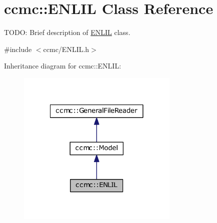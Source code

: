 \hypertarget{classccmc_1_1_e_n_l_i_l}{\section{ccmc\-:\-:E\-N\-L\-I\-L Class Reference}
\label{classccmc_1_1_e_n_l_i_l}
}


T\-O\-D\-O\-: Brief description of \hyperlink{classccmc_1_1_e_n_l_i_l}{E\-N\-L\-I\-L} class.  




{\ttfamily \#include $<$ccmc/\-E\-N\-L\-I\-L.\-h$>$}



Inheritance diagram for ccmc\-:\-:E\-N\-L\-I\-L\-:\nopagebreak
\begin{figure}[H]
\begin{center}
\leavevmode
\includegraphics[width=218pt]{classccmc_1_1_e_n_l_i_l__inherit__graph}
\end{center}
\end{figure}


